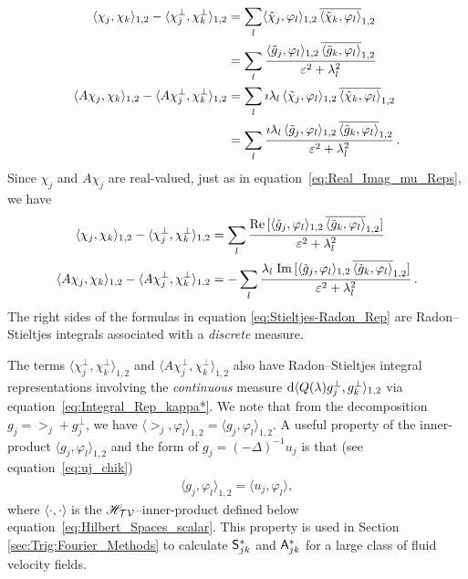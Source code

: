 \documentclass[amsa]{ipart}
\begin{document}
%
\begin{align}\label{eq:Stieltjes-Radon_Pre}
  \langle\chi_j,\chi_k\rangle_{1,2}-\langle\chi_j^\perp,\chi_k^\perp\rangle_{1,2}&=\sum_l\langle\chit_j,\varphi_l\rangle_{1,2}\,\overline{\langle\chit_k,\varphi_l\rangle}_{1,2}
         \\\notag
         &=\sum_l\frac{\langle\gt_j,\varphi_l\rangle_{1,2}\,\overline{\langle\gt_k,\varphi_l\rangle}_{1,2}}{\varepsilon^2+\lambda_l^2}
         \\\notag
  \langle A\chi_j,\chi_k\rangle_{1,2}-\langle A\chi_j^\perp,\chi_k^\perp\rangle_{1,2}&=\sum_l\imath\lambda_l\,\langle\chit_j,\varphi_l\rangle_{1,2}\,\overline{\langle\chit_k,\varphi_l\rangle}_{1,2}
         \\\notag
         &=\sum_l\frac{\imath\lambda_l\,\langle\gt_j,\varphi_l\rangle_{1,2}\,\overline{\langle\gt_k,\varphi_l\rangle}_{1,2}}{\varepsilon^2+\lambda_l^2}\,.
         \notag
\end{align}
%
Since $\chi_j$ and $A\chi_j$ are real-valued, just as in
equation~\eqref{eq:Real_Imag_mu_Reps}, we have 
%
\begin{align}\label{eq:Stieltjes-Radon_Rep}
  \langle\chi_j,\chi_k\rangle_{1,2}-\langle\chi_j^\perp,\chi_k^\perp\rangle_{1,2}
  &=\sum_l\frac{\Real[\langle\gt_j,\varphi_l\rangle_{1,2}\,\overline{\langle\gt_k,\varphi_l\rangle}_{1,2}]}{\varepsilon^2+\lambda_l^2}
         \\
  \langle A\chi_j,\chi_k\rangle_{1,2}-\langle A\chi_j^\perp,\chi_k^\perp\rangle_{1,2}
  &=-\sum_l\frac{\lambda_l\;\Imag[\langle\gt_j,\varphi_l\rangle_{1,2}\,\overline{\langle\gt_k,\varphi_l\rangle}_{1,2}]}{\varepsilon^2+\lambda_l^2}\,.
         \notag
\end{align}
%
The right sides of the formulas in equation
\eqref{eq:Stieltjes-Radon_Rep} are Radon--Stieltjes integrals
associated with a \emph{discrete} measure. 




The terms $\langle\chi_j^\perp,\chi_k^\perp\rangle_{1,2}$ and
$\langle A\chi_j^\perp,\chi_k^\perp\rangle_{1,2}$ also have Radon--Stieltjes integral representations
involving the \emph{continuous} measure $\mathrm{d}\langle Q(\lambda)g_j^\perp,g_k^\perp\rangle_{1,2}$
via equation~\eqref{eq:Integral_Rep_kappa*}. We note that from the 
decomposition $g_j=\gt_j+g^\perp_j$, we have
$\langle\gt_j,\varphi_l\rangle_{1,2}=\langle g_j,\varphi_l\rangle_{1,2}$. A useful property of the inner-product
$\langle g_j,\varphi_l\rangle_{1,2}$ and the form of $g_j=(-\Delta)^{-1}u_j$ is that (see equation~\eqref{eq:uj_chik})
%
\begin{align}\label{eq:H1_L2}
  \langle g_j,\varphi_l\rangle_{1,2}=\langle u_j,\varphi_l\rangle,
\end{align}
%
where $\langle\cdot,\cdot\rangle$ is the $\mathscr{H}_{\mathcal{T}\mathcal{V}}$--inner-product defined below
equation~\eqref{eq:Hilbert_Spaces_scalar}. 
This property is used in Section \ref{sec:Trig:Fourier_Methods} to
calculate $\mathsf{S}^*_{jk}$ and $\mathsf{A}^*_{jk}$ for a large class of fluid
velocity fields.    
\end{document}
